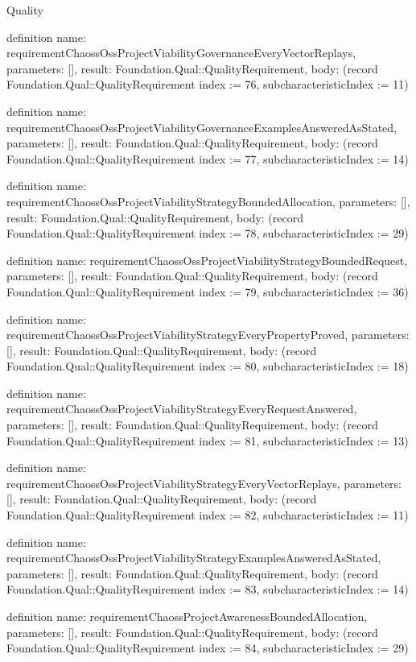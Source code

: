 \begin{lexlean}{Quality}
\begin{semanticmodule}
definition{
  name: requirementChaossOssProjectViabilityGovernanceEveryVectorReplays,
  parameters: [],
  result: Foundation.Qual::QualityRequirement,
  body: (record Foundation.Qual::QualityRequirement {index := 76, subcharacteristicIndex := 11})
}

definition{
  name: requirementChaossOssProjectViabilityGovernanceExamplesAnsweredAsStated,
  parameters: [],
  result: Foundation.Qual::QualityRequirement,
  body: (record Foundation.Qual::QualityRequirement {index := 77, subcharacteristicIndex := 14})
}

definition{
  name: requirementChaossOssProjectViabilityStrategyBoundedAllocation,
  parameters: [],
  result: Foundation.Qual::QualityRequirement,
  body: (record Foundation.Qual::QualityRequirement {index := 78, subcharacteristicIndex := 29})
}

definition{
  name: requirementChaossOssProjectViabilityStrategyBoundedRequest,
  parameters: [],
  result: Foundation.Qual::QualityRequirement,
  body: (record Foundation.Qual::QualityRequirement {index := 79, subcharacteristicIndex := 36})
}

definition{
  name: requirementChaossOssProjectViabilityStrategyEveryPropertyProved,
  parameters: [],
  result: Foundation.Qual::QualityRequirement,
  body: (record Foundation.Qual::QualityRequirement {index := 80, subcharacteristicIndex := 18})
}

definition{
  name: requirementChaossOssProjectViabilityStrategyEveryRequestAnswered,
  parameters: [],
  result: Foundation.Qual::QualityRequirement,
  body: (record Foundation.Qual::QualityRequirement {index := 81, subcharacteristicIndex := 13})
}

definition{
  name: requirementChaossOssProjectViabilityStrategyEveryVectorReplays,
  parameters: [],
  result: Foundation.Qual::QualityRequirement,
  body: (record Foundation.Qual::QualityRequirement {index := 82, subcharacteristicIndex := 11})
}

definition{
  name: requirementChaossOssProjectViabilityStrategyExamplesAnsweredAsStated,
  parameters: [],
  result: Foundation.Qual::QualityRequirement,
  body: (record Foundation.Qual::QualityRequirement {index := 83, subcharacteristicIndex := 14})
}

definition{
  name: requirementChaossProjectAwarenessBoundedAllocation,
  parameters: [],
  result: Foundation.Qual::QualityRequirement,
  body: (record Foundation.Qual::QualityRequirement {index := 84, subcharacteristicIndex := 29})
}


\end{semanticmodule}
\end{lexlean}
